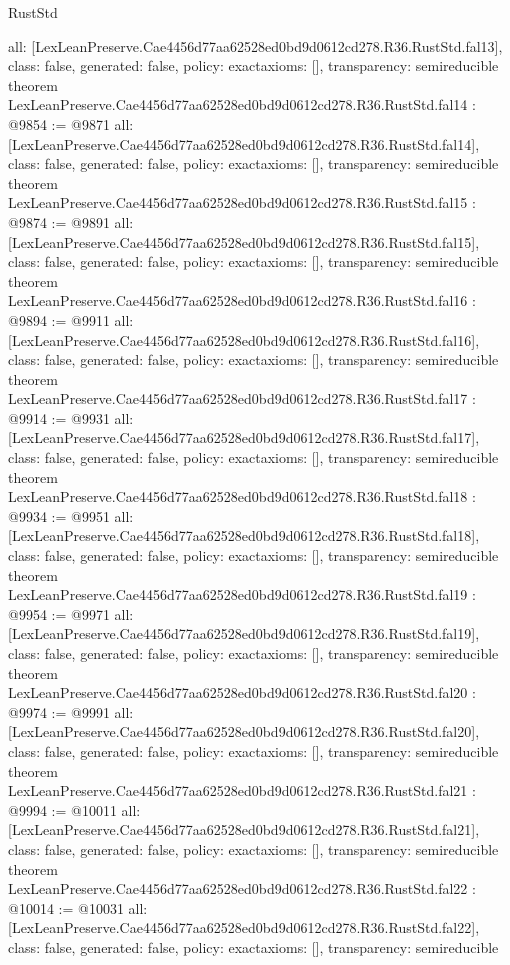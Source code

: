 \begin{lexlean}{RustStd}
\begin{coremodule}
{  all: [LexLeanPreserve.Cae4456d77aa62528ed0bd9d0612cd278.R36.RustStd.fal13],
  class: false,
  generated: false,
  policy: exact{axioms: []},
  transparency: semireducible
}
theorem LexLeanPreserve.Cae4456d77aa62528ed0bd9d0612cd278.R36.RustStd.fal14 : @9854 := @9871 {
  all: [LexLeanPreserve.Cae4456d77aa62528ed0bd9d0612cd278.R36.RustStd.fal14],
  class: false,
  generated: false,
  policy: exact{axioms: []},
  transparency: semireducible
}
theorem LexLeanPreserve.Cae4456d77aa62528ed0bd9d0612cd278.R36.RustStd.fal15 : @9874 := @9891 {
  all: [LexLeanPreserve.Cae4456d77aa62528ed0bd9d0612cd278.R36.RustStd.fal15],
  class: false,
  generated: false,
  policy: exact{axioms: []},
  transparency: semireducible
}
theorem LexLeanPreserve.Cae4456d77aa62528ed0bd9d0612cd278.R36.RustStd.fal16 : @9894 := @9911 {
  all: [LexLeanPreserve.Cae4456d77aa62528ed0bd9d0612cd278.R36.RustStd.fal16],
  class: false,
  generated: false,
  policy: exact{axioms: []},
  transparency: semireducible
}
theorem LexLeanPreserve.Cae4456d77aa62528ed0bd9d0612cd278.R36.RustStd.fal17 : @9914 := @9931 {
  all: [LexLeanPreserve.Cae4456d77aa62528ed0bd9d0612cd278.R36.RustStd.fal17],
  class: false,
  generated: false,
  policy: exact{axioms: []},
  transparency: semireducible
}
theorem LexLeanPreserve.Cae4456d77aa62528ed0bd9d0612cd278.R36.RustStd.fal18 : @9934 := @9951 {
  all: [LexLeanPreserve.Cae4456d77aa62528ed0bd9d0612cd278.R36.RustStd.fal18],
  class: false,
  generated: false,
  policy: exact{axioms: []},
  transparency: semireducible
}
theorem LexLeanPreserve.Cae4456d77aa62528ed0bd9d0612cd278.R36.RustStd.fal19 : @9954 := @9971 {
  all: [LexLeanPreserve.Cae4456d77aa62528ed0bd9d0612cd278.R36.RustStd.fal19],
  class: false,
  generated: false,
  policy: exact{axioms: []},
  transparency: semireducible
}
theorem LexLeanPreserve.Cae4456d77aa62528ed0bd9d0612cd278.R36.RustStd.fal20 : @9974 := @9991 {
  all: [LexLeanPreserve.Cae4456d77aa62528ed0bd9d0612cd278.R36.RustStd.fal20],
  class: false,
  generated: false,
  policy: exact{axioms: []},
  transparency: semireducible
}
theorem LexLeanPreserve.Cae4456d77aa62528ed0bd9d0612cd278.R36.RustStd.fal21 : @9994 := @10011 {
  all: [LexLeanPreserve.Cae4456d77aa62528ed0bd9d0612cd278.R36.RustStd.fal21],
  class: false,
  generated: false,
  policy: exact{axioms: []},
  transparency: semireducible
}
theorem LexLeanPreserve.Cae4456d77aa62528ed0bd9d0612cd278.R36.RustStd.fal22 : @10014 := @10031 {
  all: [LexLeanPreserve.Cae4456d77aa62528ed0bd9d0612cd278.R36.RustStd.fal22],
  class: false,
  generated: false,
  policy: exact{axioms: []},
  transparency: semireducible
}
\end{coremodule}
\end{lexlean}
